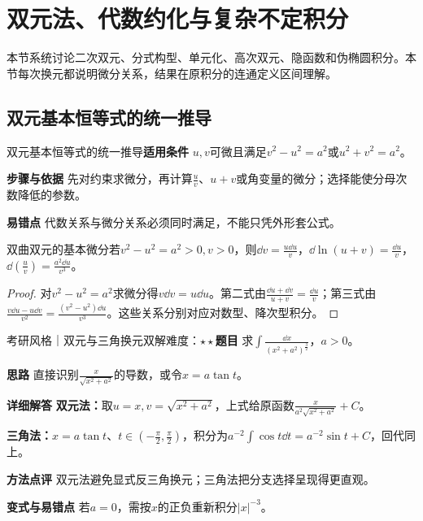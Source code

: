 \section{双元法、代数约化与复杂不定积分}\label{deep:integral_source_deep}

\begin{examtip}本节系统讨论二次双元、分式构型、单元化、高次双元、隐函数和伪椭圆积分。本节每次换元都说明微分关系，结果在原积分的连通定义区间理解。\end{examtip}

\subsection{双元基本恒等式的统一推导}\label{deep:integral_source_deep:duality}

\begin{method}{双元基本恒等式的统一推导}\textbf{适用条件} $u,v$可微且满足$v^2-u^2=a^2$或$u^2+v^2=a^2$。\par\textbf{步骤与依据} 先对约束求微分，再计算$\frac{u}{v}$、$u+v$或角变量的微分；选择能使分母次数降低的参数。\par\textbf{易错点} 代数关系与微分关系必须同时满足，不能只凭外形套公式。\end{method}

\begin{theorem}{双曲双元的基本微分}若$v^2-u^2=a^2>0,v>0$，则$\dd v=\frac{u\dd u}{v}$，$\dd\ln(u+v)=\frac{\dd u}{v}$，$\dd(\frac{u}{v})=\frac{a^2\dd u}{v^3}$。\end{theorem}\begin{proof}对$v^2-u^2=a^2$求微分得$v\dd v=u\dd u$。第二式由$\frac{\dd u+\dd v}{u+v}=\frac{\dd u}{v}$；第三式由$\frac{v\dd u-u\dd v}{v^2}=\frac{(v^2-u^2)\dd u}{v^3}$。这些关系分别对应对数型、降次型积分。\end{proof}

\begin{example}{考研风格｜双元与三角换元双解}{难度：$\star\star$}\label{deep:ex:integral_source_deep:dual1}\textbf{题目} 求$\int\frac{\dd x}{(x^2+a^2)^{\frac{3}{2}}}$，$a>0$。\par\textbf{思路} 直接识别$\frac{x}{\sqrt{x^2+a^2}}$的导数，或令$x=a\tan t$。\par\textbf{详细解答} \textbf{双元法：}取$u=x,v=\sqrt{x^2+a^2}$，上式给原函数$\frac{x}{a^2\sqrt{x^2+a^2}}+C$。\par\textbf{三角法：}$x=a\tan t$、$t\in(-\frac{\pi}{2},\frac{\pi}{2})$，积分为$a^{-2}\int\cos t\dd t=a^{-2}\sin t+C$，回代同上。\par\textbf{方法点评} 双元法避免显式反三角换元；三角法把分支选择呈现得更直观。\par\textbf{变式与易错点} 若$a=0$，需按$x$的正负重新积分$|x|^{-3}$。\end{example}

